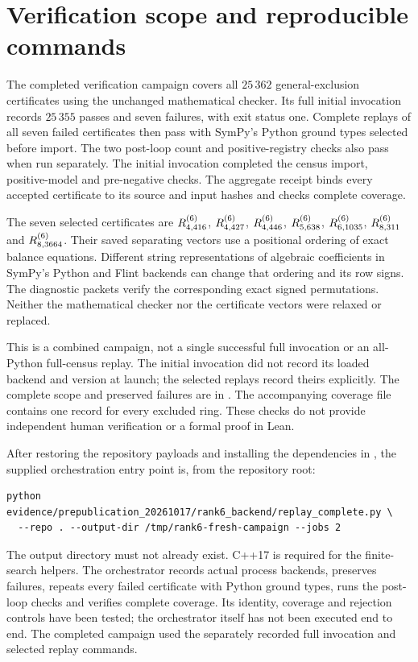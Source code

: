 \documentclass[11pt]{article}
\begin{document}
\section{Verification scope and reproducible commands}
The completed verification campaign covers all $25\,362$ general-exclusion
certificates using the unchanged mathematical checker. Its full initial
invocation records $25\,355$ passes and seven failures, with exit status
one. Complete replays of all seven failed certificates then pass with
SymPy's Python ground types selected before import. The two post-loop
count and positive-registry checks also pass when run separately. The
initial invocation completed the census import, positive-model and
pre-negative checks. The aggregate receipt binds every accepted
certificate to its source and input hashes and checks complete coverage.

The seven selected certificates are $R^{(6)}_{4,416}$, $R^{(6)}_{4,427}$,
$R^{(6)}_{4,446}$, $R^{(6)}_{5,638}$, $R^{(6)}_{6,1035}$, $R^{(6)}_{8,311}$ and
$R^{(6)}_{8,3664}$. Their saved separating vectors use a positional ordering
of exact balance equations. Different string representations of
algebraic coefficients in SymPy's Python and Flint backends can change
that ordering and its row signs. The diagnostic packets verify the
corresponding exact signed permutations. Neither the mathematical
checker nor the certificate vectors were relaxed or replaced.

This is a combined campaign, not a single successful full invocation or
an all-Python full-census replay. The initial invocation did not record
its loaded backend and version at launch; the selected replays record
theirs explicitly. The complete scope and preserved failures are in
.
The accompanying coverage file contains one record for every excluded
ring. These checks do not provide independent human verification or a
formal proof in Lean.

After restoring the repository payloads and installing the dependencies
in , the supplied orchestration
entry point is, from the repository root:
\begin{verbatim}
python evidence/prepublication_20261017/rank6_backend/replay_complete.py \
  --repo . --output-dir /tmp/rank6-fresh-campaign --jobs 2
\end{verbatim}
The output directory must not already exist. C++17 is required for the
finite-search helpers. The orchestrator records actual process
backends, preserves failures, repeats every failed certificate with
Python ground types, runs the post-loop checks and verifies complete
coverage. Its identity, coverage and rejection controls have been
tested; the orchestrator itself has not been executed end to end.
The completed campaign used the separately recorded full invocation
and selected replay commands.
\end{document}
